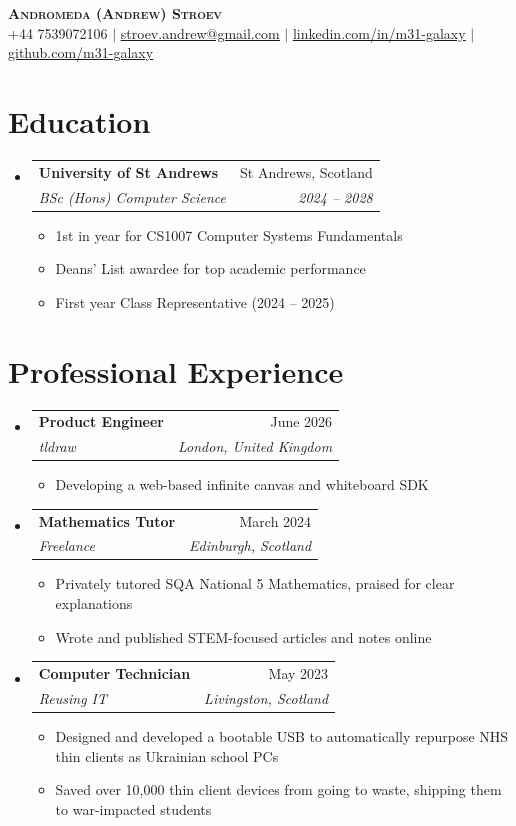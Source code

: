 \documentclass[letterpaper,11pt]{article}
\makeatletter
\newcommand{\resumeItem}[1]{
  \item\small{
    {#1 \vspace{-2pt}}
  }
}
\newcommand{\resumeSubheading}[4]{
  \vspace{-2pt}\item
    \begin{tabular*}{0.97\textwidth}[t]{l@{\extracolsep{\fill}}r}
      \textbf{#1} & #2 \\
      \textit{\small#3} & \textit{\small #4} \\
    \end{tabular*}\vspace{-7pt}
}
\newcommand{\resumeSubHeadingListStart}{\begin{itemize}[leftmargin=0.15in, label={}]}
\newcommand{\resumeSubHeadingListEnd}{\end{itemize}}
\newcommand{\resumeItemListStart}{\begin{itemize}}
\newcommand{\resumeItemListEnd}{\end{itemize}\vspace{-5pt}}
\makeatother
\begin{document}
\begin{center}
    \textbf{\Huge \scshape Andromeda (Andrew) Stroev} \\ \vspace{1pt}
    \small +44 7539072106 $|$ \href{mailto:stroev.andrew@gmail.com}{\underline{stroev.andrew@gmail.com}} $|$ 
    \href{https://linkedin.com/in/m31-galaxy}{\underline{linkedin.com/in/m31-galaxy}} $|$
    \href{https://github.com/m31-galaxy}{\underline{github.com/m31-galaxy}}
\end{center}

\section{Education}
  \resumeSubHeadingListStart
    \resumeSubheading
      {University of St Andrews}{St Andrews, Scotland}
      {BSc (Hons) Computer Science}{2024 -- 2028}
      \resumeItemListStart
        \resumeItem{1st in year for CS1007 Computer Systems Fundamentals}
        \resumeItem{Deans' List awardee for top academic performance}
        \resumeItem{First year Class Representative (2024 -- 2025)}
      \resumeItemListEnd
  \resumeSubHeadingListEnd

\section{Professional Experience}
  \resumeSubHeadingListStart
    \resumeSubheading
      {Product Engineer}{June 2026}
      {tldraw}{London, United Kingdom}
      \resumeItemListStart
        \resumeItem{Developing a web-based infinite canvas and whiteboard SDK}
      \resumeItemListEnd
    \resumeSubheading
      {Mathematics Tutor}{March 2024}
      {Freelance}{Edinburgh, Scotland}
      \resumeItemListStart
        \resumeItem{Privately tutored SQA National 5 Mathematics, praised for clear explanations}
        \resumeItem{Wrote and published STEM-focused articles and notes online}
      \resumeItemListEnd
    \resumeSubheading
      {Computer Technician}{May 2023}
      {Reusing IT}{Livingston, Scotland}
      \resumeItemListStart
        \resumeItem{Designed and developed a bootable USB to automatically repurpose NHS thin clients as Ukrainian school PCs}
        \resumeItem{Saved over 10,000 thin client devices from going to waste, shipping them to war-impacted students}
      \resumeItemListEnd
  \resumeSubHeadingListEnd
\end{document}
